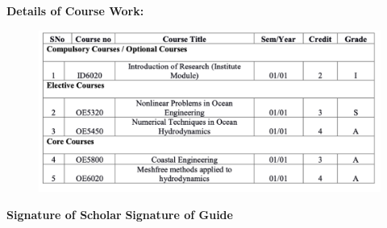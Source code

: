 \documentclass[preprint,12pt]{article}
\newcommand\tab[1][1cm]{\hspace*{#1}}
\begin{document}
\textbf{Details of Course Work: }
\begin{figure}[H]
    \centering
    \includegraphics[width=\textwidth]{RPS.png}
    \label{fig:my_label}
\end{figure}

\textbf{Signature of Scholar} \tab \tab \tab \tab \tab \textbf{Signature of Guide}
\end{document}
